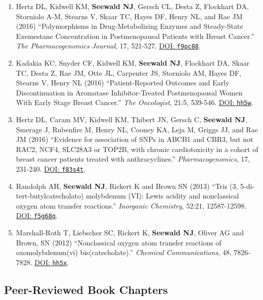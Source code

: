 \documentclass[letterpaper,11pt]{article} %
\begin{document}
\begin{enumerate}
		\item Hertz DL, Kidwell KM, \textbf{Seewald NJ}, Gersch CL, Desta Z, Flockhart DA, Storniolo A-M, Stearns V, Skaar TC, Hayes DF, Henry NL, and Rae JM (2016) ``Polymorphisms in Drug-Metabolizing Enzymes and Steady-State Exemestane Concentration in Postmenopausal Patients with Breast Cancer.'' \textit{The Pharmacogenomics Journal}, 17, 521-527. \href{https://doi.org/f9pc88}{DOI: \texttt{f9pc88}}.
			
		\item Kadakia KC, Snyder CF, Kidwell KM, \textbf{Seewald NJ}, Flockhart DA, Skaar TC, Desta Z, Rae JM, Otte JL, Carpenter JS, Storniolo AM, Hayes DF, Stearns V, Henry NL (2016) ``Patient-Reported Outcomes and Early Discontinuation in Aromatase Inhibitor-Treated Postmenopausal Women With Early Stage Breast Cancer.'' \textit{The Oncologist}, 21:5, 539-546. \href{https://doi.org/hh5w}{DOI: \texttt{hh5w}}.
			
		\item Hertz DL, Caram MV, Kidwell KM, Thibert JN, Gersch C, \textbf{Seewald NJ}, Smerage J, Rubenfire M, Henry NL, Cooney KA, Leja M, Griggs JJ, and Rae JM (2016) ``Evidence for association of SNPs in ABCB1 and CBR3, but not RAC2, NCF4, SLC28A3 or TOP2B, with chronic cardiotoxicity in a cohort of breast cancer patients treated with anthracyclines.'' \textit{Pharmacogenomics}, 17, 231-240. \href{https://doi.org/f83s4t}{DOI: \texttt{f83s4t}}.
			
		\item Randolph AH, \textbf{Seewald NJ}, Rickert K and Brown SN (2013) ``Tris (3, 5-di-tert-butylcate\-cholato) molybdenum (VI): Lewis acidity and nonclassical oxygen atom transfer reactions.'' \textit{Inorganic Chemistry}, 52:21, 12587-12598. \href{https://doi.org/f5g68q}{DOI: \texttt{f5g68q}}.

		\item Marshall-Roth T, Liebscher SC, Rickert K, \textbf{Seewald NJ}, Oliver AG and Brown, SN (2012) ``Nonclassical oxygen atom transfer reactions of oxomolybdenum(vi) bis(catecholate).'' \textit{Chemical Communications}, 48, 7826-7828. \href{https://doi.org/hh5x}{DOI: \texttt{hh5x}}.
	\end{enumerate}

	
	\subsection*{Peer-Reviewed Book Chapters}
	
\end{document}
